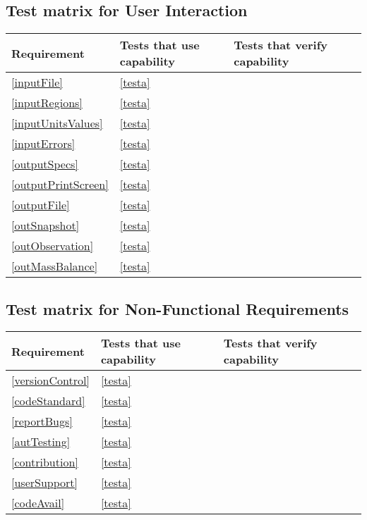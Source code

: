 \subsection{Test matrix for User Interaction}
\begin{tabular}{|l|l|l|l|}
	\hline
	Requirement & Tests that use capability & Tests that verify capability \\
	\hline
	\hline
	\ref{inputFile} & \ref{testa} \\
	\hline
	\ref{inputRegions} & \ref{testa} \\
	\hline
	\ref{inputUnitsValues} & \ref{testa} \\
	\hline
	\ref{inputErrors} & \ref{testa} \\
	\hline
	\ref{outputSpecs} & \ref{testa} \\
	\hline
	\ref{outputPrintScreen} & \ref{testa} \\
	\hline
	\ref{outputFile} & \ref{testa} \\
	\hline
	\ref{outSnapshot} & \ref{testa} \\
	\hline
	\ref{outObservation} & \ref{testa} \\
	\hline
	\ref{outMassBalance} & \ref{testa} \\
	\hline
\end{tabular}

\subsection{Test matrix for Non-Functional Requirements}
\begin{tabular}{|l|l|l|l|}
	\hline
	Requirement & Tests that use capability & Tests that verify capability \\
	\hline
	\hline
	\ref{versionControl} & \ref{testa} \\
	\hline
	\ref{codeStandard} & \ref{testa} \\
	\hline
	\ref{reportBugs} & \ref{testa} \\
	\hline
	\ref{autTesting} & \ref{testa} \\
	\hline
	\ref{contribution} & \ref{testa} \\
	\hline
	\ref{userSupport} & \ref{testa} \\
	\hline
	\ref{codeAvail} & \ref{testa} \\
	\hline
\end{tabular}